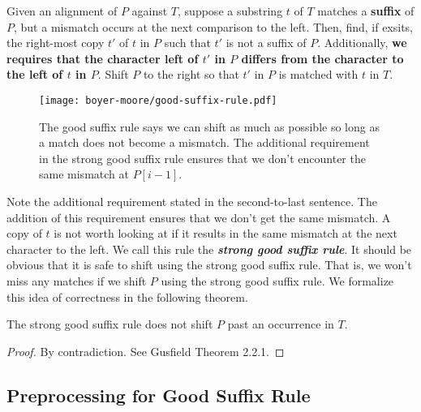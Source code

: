 \begin{rules} 
    \normalfont
    Given an alignment of $P$ against $T$, suppose a substring $t$ of $T$ matches a \textbf{suffix} of $P$, but a mismatch occurs at the next comparison to the left. Then, find, if exsits, the right-most copy $t'$ of $t$ in $P$ such that $t'$ is not a suffix of $P$. Additionally, \textbf{we requires that the character left of $t'$ in $P$ differs from the character to the left of $t$ in $P$}. Shift $P$ to the right so that $t'$ in $P$ is matched with $t$ in $T$.
\end{rules}

\begin{figure}[htbp]
    \centering
    \texttt{[image: boyer-moore/good-suffix-rule.pdf]}
    \caption{The good suffix rule says we can shift as much as possible so long as a match does not become a mismatch. The additional requirement in the strong good suffix rule ensures that we don't encounter the same mismatch at $P[i-1]$.}
    \label{fig:boyer-moore-good-suffix-rule}
\end{figure}

Note the additional requirement stated in the second-to-last sentence. The addition of this requirement ensures that we don't get the same mismatch. A copy of $t$ is not worth looking at if it results in the same mismatch at the next character to the left. We call this rule the \textit{\textbf{strong good suffix rule}}. It should be obvious that it is safe to shift using the strong good suffix rule. That is, we won't miss any matches if we shift $P$ using the strong good suffix rule. We formalize this idea of correctness in the following theorem.

\begin{theorem}
    The strong good suffix rule does not shift $P$ past an occurrence in $T$.
\end{theorem}

\begin{proof}
    By contradiction. See Gusfield Theorem 2.2.1.
\end{proof}

\subsection{Preprocessing for Good Suffix Rule}


